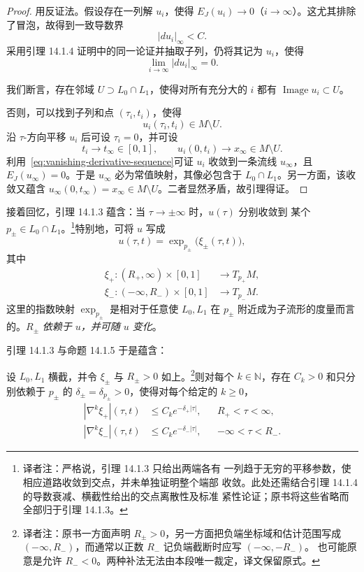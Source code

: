 \begin{proof}
用反证法。假设存在一列\termNonStationary{}解 $u_i$，使得
$E_J(u_i)\to0$（$i\to\infty$）。这尤其排除了冒泡，故得到一致导数界
\[
  |du_i|_\infty<C.
\]
采用引理 14.1.4 证明中的同一论证并抽取子列，仍将其记为 $u_i$，使得
\begin{equation}
  \lim_{i\to\infty}|du_i|_\infty=0.
\label{eq:vanishing-derivative-sequence}
\end{equation}

我们断言，存在邻域 $U\supset L_0\cap L_1$，使得对所有充分大的 $i$ 都有
$\operatorname{Image}u_i\subset U$。

否则，可以找到子列和点 $(\tau_i,t_i)$，使得
\[
  u_i(\tau_i,t_i)\in M\setminus U.
\]
沿 $\tau$-方向平移 $u_i$ 后可设 $\tau_i=0$，并可设
\[
  t_i\longrightarrow t_\infty\in[0,1],
  \qquad
  u_i(0,t_i)\longrightarrow x_\infty\in M\setminus U.
\]
利用~\eqref{eq:vanishing-derivative-sequence}可证 $u_i$ 收敛到一条\personFloer{}流线
$u_\infty$，且 $E_J(u_\infty)=0$。于是 $u_\infty$ 必为常值映射，其像必包含于
$L_0\cap L_1$。另一方面，该收敛又蕴含
$u_\infty(0,t_\infty)=x_\infty\in M\setminus U$。二者显然矛盾，故引理得证。
\end{proof}

接着回忆，引理 14.1.3 蕴含：当 $\tau\to\pm\infty$ 时，$u(\tau)$ 分别收敛到
某个 $p_\pm\in L_0\cap L_1$。\footnote{译者注：严格说，引理 14.1.3 只给出两端各有
一列趋于无穷的平移参数，使相应道路收敛到交点，并未单独证明整个端部
收敛。此处还需结合引理 14.1.4 的导数衰减、横截性给出的交点离散性及标准
紧性论证；原书将这些省略而全部归于引理 14.1.3。}特别地，可将 $u$ 写成
\[
  u(\tau,t)=\exp_{p_\pm}\bigl(\xi_\pm(\tau,t)\bigr),
\]
其中
\begin{align}
  \xi_+:(R_+,\infty)\times[0,1]&\longrightarrow T_{p_+}M,
  \label{eq:positive-end-exponential-coordinate}\\
  \xi_-:(-\infty,R_-)\times[0,1]&\longrightarrow T_{p_-}M.
  \label{eq:negative-end-exponential-coordinate}
\end{align}
这里的指数映射 $\exp_{p_\pm}$ 是相对于任意使 $L_0,L_1$ 在 $p_\pm$ 附近成为\emph{\termTotallyGeodesic{}}子流形的\personRiemann{}度量而言的。$R_\pm$ \emph{依赖于 $u$，并可随
$u$ 变化}。

引理 14.1.3 与命题 14.1.5 于是蕴含：

\begin{proposition}
\label{prop:asymptotic-coordinate-decay}
设 $L_0,L_1$ 横截，并令 $\xi_\pm$ 与 $R_\pm>0$ 如上。\footnote{译者注：原书一方面声明 $R_\pm>0$，另一方面把负端坐标域和估计范围写成
$(-\infty,R_-)$，而通常以正数 $R_-$ 记负端截断时应写 $(-\infty,-R_-)$。
也可能原意是允许 $R_-<0$。两种补法无法由本段唯一裁定，译文保留原式。}则对每个
$k\in\mathbb N$，存在 $C_k>0$ 和只分别依赖于 $p_\pm$ 的
$\delta_\pm=\delta_{p_\pm}>0$，使得对每个给定的 $k\geq0$，
\begin{align}
  |\nabla^k\xi_+|(\tau,t)
  &\leq C_ke^{-\delta_+|\tau|},
  &&R_+<\tau<\infty,
  \label{eq:positive-end-coordinate-decay}\\
  |\nabla^k\xi_-|(\tau,t)
  &\leq C_ke^{-\delta_-|\tau|},
  &&-\infty<\tau<R_-.
  \label{eq:negative-end-coordinate-decay}
\end{align}
\end{proposition}

